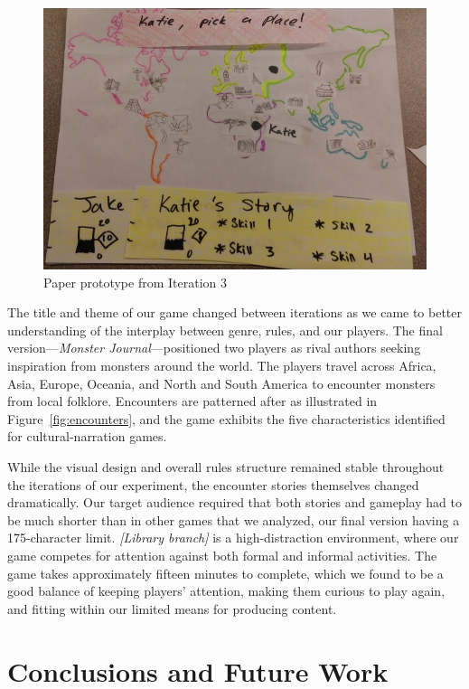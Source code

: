 \documentclass[a4paper]{article}
\begin{document}
\begin{figure}
\centering
\includegraphics[width=\figwidth]{paper-prototype}
\caption{Paper prototype from Iteration 3}
\label{fig:paper-prototype}
\end{figure}

The title and theme of our game changed between iterations as we came
to better understanding of the interplay between genre, rules, and our
players.  The final version---\textit{Monster Journal}---positioned
two players as rival authors seeking inspiration from monsters around
the world. The players travel across Africa, Asia, Europe, Oceania,
and North and South America to encounter monsters from local folklore.
Encounters are patterned after \totan{} as illustrated in
Figure~\ref{fig:encounters}, and the game exhibits the five characteristics
identified for cultural-narration games. 

While the visual design and overall rules structure remained stable
throughout the iterations of our experiment, the encounter stories
themselves changed dramatically.
Our target audience required that both stories and gameplay 
had to be much shorter than in other games that we analyzed,
our final version having a 175-character limit.
\textit{[Library branch]} is a high-distraction environment,
where our game competes for attention against both formal and informal
activities. The game takes approximately fifteen minutes to complete,
which we found to be a good balance of keeping players' attention,
making them curious to play again,
and fitting within our limited means for producing content.


\section{Conclusions and Future Work}
\end{document}
